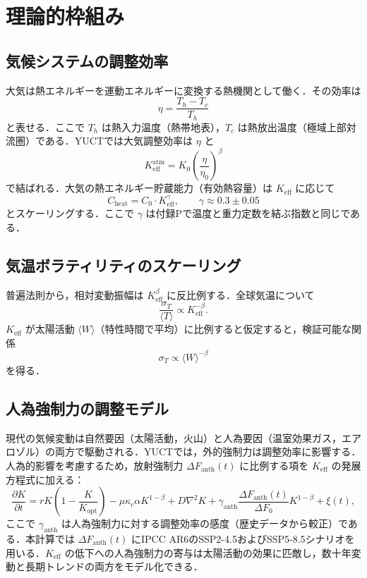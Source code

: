 \documentclass[11pt,a4paper]{article}
\newcommand{\Keff}{K_{\mathrm{eff}}}
\newcommand{\be}{\beta}
\newcommand{\ga}{\gamma}
\begin{document}
	\section{理論的枠組み}
	
	\subsection{気候システムの調整効率}
	
	大気は熱エネルギーを運動エネルギーに変換する熱機関として働く．その効率は
	\[
	\eta = \frac{T_h - T_c}{T_h}
	\]
	と表せる．ここで $T_h$ は熱入力温度（熱帯地表），$T_c$ は熱放出温度（極域上部対流圏）である．YUCTでは大気調整効率は $\eta$ と
	\[
	\Keff^{\text{atm}} = K_0 \left( \frac{\eta}{\eta_0} \right)^{\be}
	\]
	で結ばれる．大気の熱エネルギー貯蔵能力（有効熱容量）は $\Keff$ に応じて
	\[
	C_{\text{heat}} = C_0 \cdot \Keff^{\ga}, \qquad \ga \approx 0.3 \pm 0.05
	\]
	とスケーリングする．ここで $\ga$ は付録Pで温度と重力定数を結ぶ指数と同じである．
	
	\subsection{気温ボラティリティのスケーリング}
	
	普遍法則から，相対変動振幅は $\Keff^{\be}$ に反比例する．全球気温について
	\[
	\frac{\sigma_T}{\langle T \rangle} \propto \Keff^{-\be}.
	\]
	$\Keff$ が太陽活動 $\langle W \rangle$（特性時間で平均）に比例すると仮定すると，検証可能な関係
	\[
	\sigma_T \propto \langle W \rangle^{-\be}
	\]
	を得る．
	
	\subsection{人為強制力の調整モデル}
	
	現代の気候変動は自然要因（太陽活動，火山）と人為要因（温室効果ガス，エアロゾル）の両方で駆動される．YUCTでは，外的強制力は調整効率に影響する．人為的影響を考慮するため，放射強制力 $\Delta F_{\mathrm{anth}}(t)$ に比例する項を $K_{\mathrm{eff}}$ の発展方程式に加える：
	\[
	\frac{\partial K}{\partial t} = r K \left(1 - \frac{K}{K_{\mathrm{opt}}}\right) - \mu \kappa_c \alpha K^{1-\beta} 
	+ D\nabla^2 K + \gamma_{\mathrm{anth}} \frac{\Delta F_{\mathrm{anth}}(t)}{\Delta F_0} K^{1-\beta} + \xi(t),
	\]
	ここで $\gamma_{\mathrm{anth}}$ は人為強制力に対する調整効率の感度（歴史データから較正）である．本計算では $\Delta F_{\mathrm{anth}}(t)$ にIPCC AR6のSSP2-4.5およびSSP5-8.5シナリオを用いる．$K_{\mathrm{eff}}$ の低下への人為強制力の寄与は太陽活動の効果に匹敵し，数十年変動と長期トレンドの両方をモデル化できる．
	
\end{document}

